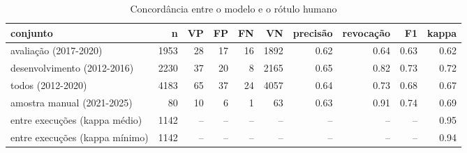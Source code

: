 \begin{table}[htbp]
\centering
\caption{Concordância entre o modelo e o rótulo humano}
\label{tab:agreement}
\begin{tabular}{lrrrrrrrrr}
\toprule
conjunto & n & VP & FP & FN & VN & precisão & revocação & F1 & kappa \\
\midrule
avaliação (2017-2020) & 1953 & 28 & 17 & 16 & 1892 & 0.62 & 0.64 & 0.63 & 0.62 \\
desenvolvimento (2012-2016) & 2230 & 37 & 20 & 8 & 2165 & 0.65 & 0.82 & 0.73 & 0.72 \\
todos (2012-2020) & 4183 & 65 & 37 & 24 & 4057 & 0.64 & 0.73 & 0.68 & 0.67 \\
amostra manual (2021-2025) & 80 & 10 & 6 & 1 & 63 & 0.63 & 0.91 & 0.74 & 0.69 \\
entre execuções (kappa médio) & 1142 & -- & -- & -- & -- & -- & -- & -- & 0.95 \\
entre execuções (kappa mínimo) & 1142 & -- & -- & -- & -- & -- & -- & -- & 0.94 \\
\bottomrule
\end{tabular}
\end{table}
